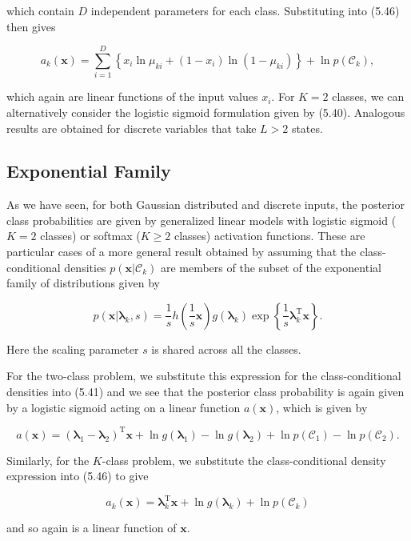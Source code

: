 \documentclass{article}
\begin{document}
which contain $D$ independent parameters for each class. Substituting into (5.46) then gives

\begin{equation}
a_{k}(\mathbf{x})=\sum_{i=1}^{D}\left\{x_{i}\ln\mu_{ki}+(1-x_{i})\ln(1-\mu_{ki})\right\}+\ln p(\mathcal{C}_{k}),
\tag{5.65}
\end{equation}

which again are linear functions of the input values $x_{i}$. For $K=2$ classes, we can alternatively consider the logistic sigmoid formulation given by (5.40). Analogous results are obtained for discrete variables that take $L>2$ states.

\subsection{Exponential Family}

As we have seen, for both Gaussian distributed and discrete inputs, the posterior class probabilities are given by generalized linear models with logistic sigmoid ($K=2$ classes) or softmax ($K\geqslant 2$ classes) activation functions. These are particular cases of a more general result obtained by assuming that the class-conditional densities $p(\mathbf{x}|\mathcal{C}_{k})$ are members of the subset of the exponential family of distributions given by

\begin{equation}
p(\mathbf{x}|\boldsymbol{\lambda}_{k},s)=\frac{1}{s}h\left(\frac{1}{s}\mathbf{x}\right)g(\boldsymbol{\lambda}_{k})\exp\left\{\frac{1}{s}\boldsymbol{\lambda}_{k}^{\mathrm{T}}\mathbf{x}\right\}.
\tag{5.66}
\end{equation}

Here the scaling parameter $s$ is shared across all the classes.

For the two-class problem, we substitute this expression for the class-conditional densities into (5.41) and we see that the posterior class probability is again given by a logistic sigmoid acting on a linear function $a(\mathbf{x})$, which is given by

\begin{equation}
a(\mathbf{x})=(\boldsymbol{\lambda}_{1}-\boldsymbol{\lambda}_{2})^{\mathrm{T}}\mathbf{x}+\ln g(\boldsymbol{\lambda}_{1})-\ln g(\boldsymbol{\lambda}_{2})+\ln p(\mathcal{C}_{1})-\ln p(\mathcal{C}_{2}).
\tag{5.67}
\end{equation}

Similarly, for the $K$-class problem, we substitute the class-conditional density expression into (5.46) to give

\begin{equation}
a_{k}(\mathbf{x})=\boldsymbol{\lambda}_{k}^{\mathrm{T}}\mathbf{x}+\ln g(\boldsymbol{\lambda}_{k})+\ln p(\mathcal{C}_{k})
\tag{5.68}
\end{equation}

and so again is a linear function of $\mathbf{x}$.
\end{document}
